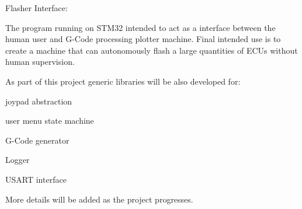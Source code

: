 Flasher Interface\+:

The program running on STM32 intended to act as a interface between the human user and G-\/\+Code processing plotter machine. Final intended use is to create a machine that can autonomously flash a large quantities of ECUs without human supervision.

As part of this project generic libraries will be also developed for\+:
\begin{DoxyItemize}
\item joypad abstraction
\item user menu state machine
\item G-\/\+Code generator
\item Logger
\item USART interface
\end{DoxyItemize}

More details will be added as the project progresses. 